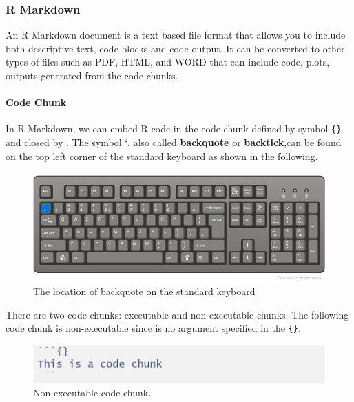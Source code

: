 \documentclass[
]{article}
\begin{document}
\hypertarget{r-markdown}{%
\subsubsection{R Markdown}\label{r-markdown}}

An R Markdown document is a text based file format that allows you to
include both descriptive text, code blocks and code output. It can be
converted to other types of files such as PDF, HTML, and WORD that can
include code, plots, outputs generated from the code chunks.

\hypertarget{code-chunk}{%
\paragraph{Code Chunk}\label{code-chunk}}

In R Markdown, we can embed R code in the code chunk defined by symbol
\texttt{\textasciigrave{}\textasciigrave{}\textasciigrave{}\{\}} and
closed by \texttt{\textasciigrave{}\textasciigrave{}\textasciigrave{}}.
The symbol \texttt{} `, also called \textbf{backquote} or
\textbf{backtick},can be found on the top left corner of the standard
keyboard as shown in the following.

\begin{figure}

{\centering \includegraphics[width=11.11in]{Key4CodeChunk} 

}

\caption{The location of backquote on the standard keyboard}\label{fig:unnamed-chunk-2}
\end{figure}

There are two code chunks: executable and non-executable chunks. The
following code chunk is non-executable since is no argument specified in
the \texttt{\{\}}.

\begin{figure}

{\centering \includegraphics[width=12.54in]{Non-executable-code-chunk} 

}

\caption{Non-executable code chunk.}\label{fig:unnamed-chunk-3}
\end{figure}
\end{document}
